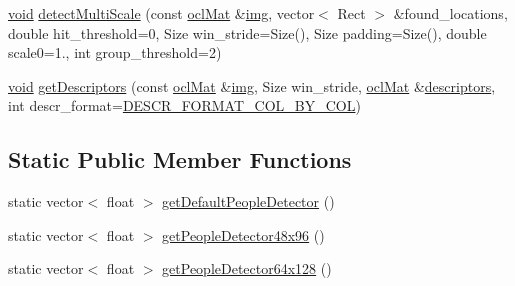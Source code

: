 \begin{DoxyCompactItemize}
\item 
\hyperlink{legacy_8hpp_a8bb47f092d473522721002c86c13b94e}{void} \hyperlink{structcv_1_1ocl_1_1HOGDescriptor_aa50f628616630390a2e88de08afa4416}{detect\-Multi\-Scale} (const \hyperlink{classcv_1_1ocl_1_1oclMat}{ocl\-Mat} \&\hyperlink{legacy_8hpp_a5349238b3772bed6eae0fda3117ccfef}{img}, vector$<$ Rect $>$ \&found\-\_\-locations, double hit\-\_\-threshold=0, Size win\-\_\-stride=Size(), Size padding=Size(), double scale0=1., int group\-\_\-threshold=2)
\item 
\hyperlink{legacy_8hpp_a8bb47f092d473522721002c86c13b94e}{void} \hyperlink{structcv_1_1ocl_1_1HOGDescriptor_aa9cdfdba40f53a217a8dd6e37f4632ef}{get\-Descriptors} (const \hyperlink{classcv_1_1ocl_1_1oclMat}{ocl\-Mat} \&\hyperlink{legacy_8hpp_a5349238b3772bed6eae0fda3117ccfef}{img}, Size win\-\_\-stride, \hyperlink{classcv_1_1ocl_1_1oclMat}{ocl\-Mat} \&\hyperlink{compat_8hpp_a1e3702ddbca6258f57508c22eff26bf2}{descriptors}, int descr\-\_\-format=\hyperlink{structcv_1_1ocl_1_1HOGDescriptor_a5c0042000c5db61a1c3fa8c54fccffeca5f7459a35f56ad3745c725e88a9d7539}{D\-E\-S\-C\-R\-\_\-\-F\-O\-R\-M\-A\-T\-\_\-\-C\-O\-L\-\_\-\-B\-Y\-\_\-\-C\-O\-L})
\end{DoxyCompactItemize}
\subsection*{Static Public Member Functions}
\begin{DoxyCompactItemize}
\item 
static vector$<$ float $>$ \hyperlink{structcv_1_1ocl_1_1HOGDescriptor_a08f932edec3a1076d25790c50b469690}{get\-Default\-People\-Detector} ()
\item 
static vector$<$ float $>$ \hyperlink{structcv_1_1ocl_1_1HOGDescriptor_a1fd36c804b71e1e5cabf8d26cf5ae4cb}{get\-People\-Detector48x96} ()
\item 
static vector$<$ float $>$ \hyperlink{structcv_1_1ocl_1_1HOGDescriptor_aa64dc25bbbe470f00f7ed1278ecee845}{get\-People\-Detector64x128} ()
\end{DoxyCompactItemize}
